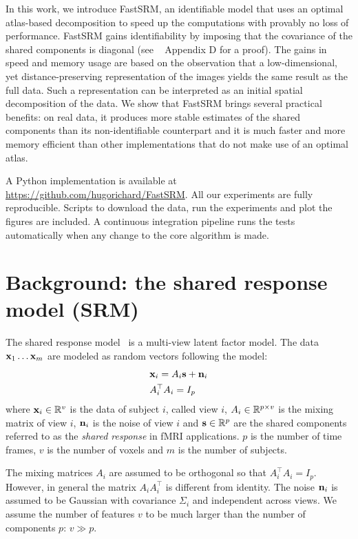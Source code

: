 \documentclass{article}
\begin{document}
In this work, we introduce FastSRM, an identifiable model that uses an optimal
atlas-based decomposition to speed up the computations with provably no loss of
performance.
%
FastSRM gains identifiability by imposing that the covariance of the shared
components is diagonal (see ~\cite{richard2020modeling} Appendix D for a proof).
%
The gains in speed and memory usage are based on the observation that a low-dimensional, yet distance-preserving
representation of the images yields the same result as the full data.
%
Such a representation can be interpreted as an initial spatial  decomposition of the data.
%
We show that FastSRM brings several practical benefits: on real data, it produces more stable
estimates of the shared components than its non-identifiable counterpart and 
 it is much faster and more memory
efficient than other implementations that do not make use of an optimal atlas.


A Python implementation is available at
\url{https://github.com/hugorichard/FastSRM}.
%
All our experiments are fully reproducible.
%
Scripts to download the data, run the experiments and plot the figures are
included.
%
A continuous integration pipeline runs the tests
automatically when any change to the core algorithm is made.
%


\section{Background: the shared response model (SRM)}
\label{sec:srm:review}
The shared response model~\cite{chen2015reduced} is a multi-view latent factor
model.
%
The data $\mathbf{x}_1 \dots \mathbf{x}_m$ are modeled as random vectors following the model:
\begin{align}
 &\mathbf{x}_i = A_i \mathbf{s} + \mathbf{n}_i \\
  &A_i^{\top}A_i = I_p
  \label{eq:model:srm}
\end{align}
where $\mathbf{x}_i \in \mathbb{R}^v$ is the data of subject $i$, called view $i$, $A_i \in \mathbb{R}^{p \times v}$ is the
mixing matrix of view $i$, $\mathbf{n}_i$ is the noise of view $i$ and $\mathbf{s} \in \mathbb{R}^p$ are the
shared components referred to as the \emph{shared response} in fMRI
applications.
%
$p$ is the number of time frames, $v$ is the number of voxels and $m$
is the number of subjects.

The mixing matrices
$A_i$ are assumed to be orthogonal so that $A_i^{\top}A_i = I_p$.
%
However, in
general the matrix $A_i A_i^{\top}$ is different from identity.
%
The noise
$\mathbf{n}_i$ is assumed to be Gaussian with covariance $\Sigma_i$ and independent
across views.
%
We assume the number of features $v$ to be much larger than the
number of components $p$: $v \gg p$.
%
\end{document}
